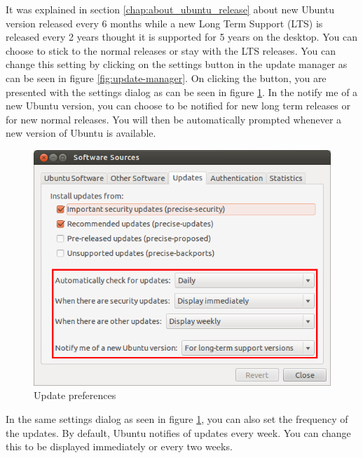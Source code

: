 \par \noindent It was explained in section \ref{chap:about_ubuntu_release} about new Ubuntu version released every 6 months while a new Long Term Support (LTS) is released every 2 years thought it is supported for 5 years on the desktop. You can choose to stick to the normal releases or stay with the LTS releases. You can change this setting by clicking on the settings button in the update manager as can be seen in figure \ref{fig:update-manager}. On clicking the button, you are presented with the settings dialog as can be seen in figure \ref{fig:update-preferences}. In the notify me of a new Ubuntu version, you can choose to be notified for new long term releases or for new normal releases. You will then be automatically prompted whenever a new version of Ubuntu is available. \\

\begin{figure}[h!]	
	\centering
	\includegraphics[width=325pt]{./images/applications/update-preferences.png}
	\caption{Update preferences}	
	\label{fig:update-preferences}		
\end{figure}

\par \noindent In the same settings dialog as seen in figure \ref{fig:update-preferences}, you can also set the frequency of the updates. By default, Ubuntu notifies of updates every week. You can change this to be displayed immediately or every two weeks.